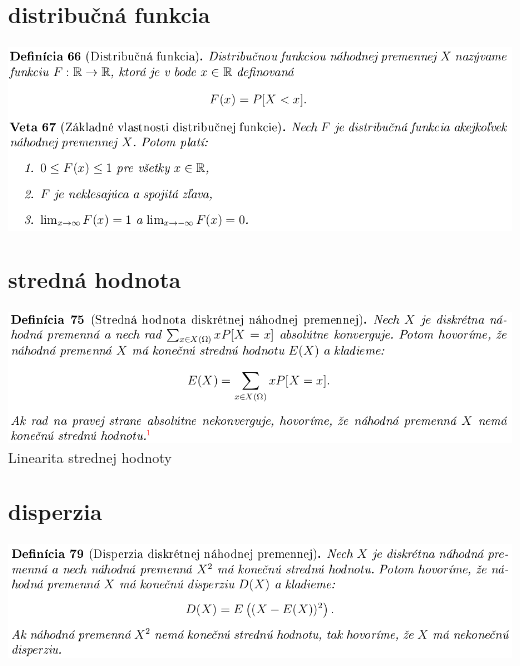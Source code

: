 \subsection {distribučná funkcia}
\includegraphics[width=1\textwidth]{images/dist_funk}\\
\subsection {stredná hodnota}
\includegraphics[width=1\textwidth]{images/stred_hod}\\
Linearita strednej hodnoty\\
\subsection {disperzia}
\includegraphics[width=1\textwidth]{images/disp}\\
